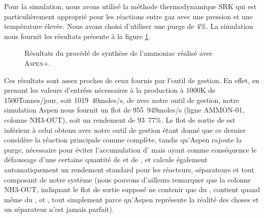 Pour la simulation, nous avons utilisé la méthode
thermodynamique \textsc{SRK} qui est particulièrement
approprié pour les réactions entre gaz avec une pression
et une température élevée. Nous avons choisi d'utiliser
une purge de 4\%. La simulation nous fournit les résultats
présente à la figure \ref{fig:resultats-aspen}.

\begin{figure}
	\centering
	\caption{Résultats du procédé de synthèse de l'ammoniac
	réalisé avec \textsc{Aspen+}.}
	\label{fig:resultats-aspen}
\end{figure}

Ces résultats sont assez proches de ceux fournis par
l'outil de gestion. En effet, en prenant les valeurs d'entrées nécessaires à la production à \unit{1000}{K} de 
\unit{1500}{Tonnes/jour}, soit \unit{1019.40}{moles/s}, de  avec notre outil de gestion, 
notre simulation Aspen nous fournit un flot de \unit{955.949}{moles/s} (ligne AMMON-01, colonne NH3-OUT), 
soit un rendement de \unit{93.77}{\%}. Le flot de sortie de  est inférieur à celui obtenu avec 
notre outil de gestion étant donné que ce dernier considère la réaction principale comme complète, tandis qu'Aspen 
rajoute la purge, nécessaire pour éviter l'accumulation d' mais ayant comme conséquence le défaussage 
d'une certaine quantité de  et de , et calcule également automatiquement un rendement 
standard pour les réacteurs, séparateurs et tout composant de notre système (nous pouvons d'ailleurs remarquer que 
la colonne NH3-OUT, indiquant le flot de sortie supposé ne contenir que du , contient quand même du 
,  et , tout simplement parce qu'Aspen représente la réalité des choses et 
un séparateur n'est jamais parfait).


